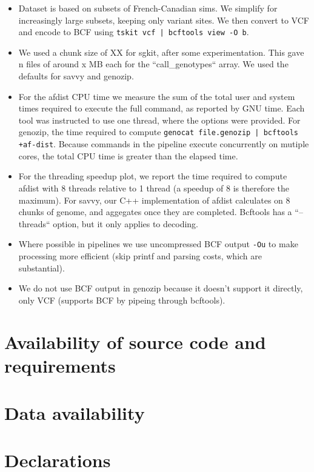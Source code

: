 \documentclass[a4paper,num-refs]{oup-contemporary}
\begin{document}
\begin{itemize}
\item Dataset is based on subsets of French-Canadian sims. We simplify
for increasingly large subsets, keeping only variant sites. We then
convert to VCF and encode to BCF using
\texttt{tskit vcf | bcftools view -O b}.
\item We used a chunk size of XX for sgkit, after some experimentation.
This gave n files of around x MB each for the ``call\_genotypes`` array.
We used the defaults for savvy and genozip.
\item For the afdist CPU time we measure the sum of the total user and
system times required to execute the full command, as reported by GNU
time. Each tool was instructed to use one thread, where the options
were provided. For genozip, the time required to compute
\texttt{genocat file.genozip | bcftools +af-dist}. Because commands
in the pipeline execute concurrently on mutiple cores, the total CPU time is
greater than the elapsed time.
\item For the threading speedup plot, we report the time required to compute
afdist with 8 threads relative to 1 thread (a speedup of 8 is therefore
the maximum). For savvy, our C++ implementation of afdist calculates
on 8 chunks of genome, and aggegates once they are completed.
Bcftools has a ``--threads`` option, but it only applies to decoding.
\item Where possible in pipelines we use uncompressed BCF
 output \texttt{-Ou} to make processing more efficient (skip printf
and parsing costs, which are substantial).
\item We do not use BCF output in genozip because it doesn't support
it directly, only VCF (supports BCF by pipeing through bcftools).
\end{itemize}

\section{Availability of source code and requirements}

\section{Data availability}

\section{Declarations}
\end{document}
